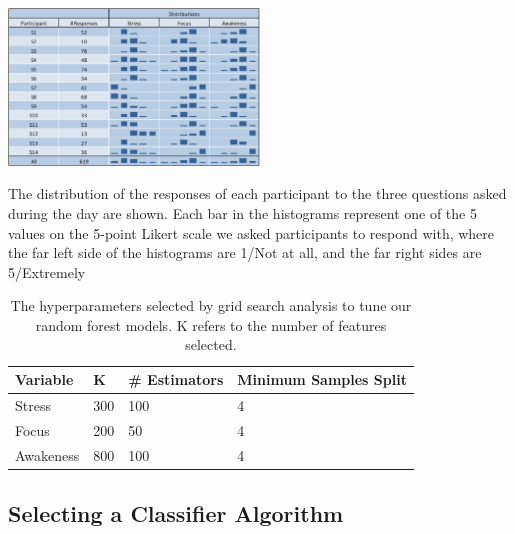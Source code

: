 \begin{table}
  \centering
      \includegraphics[width=0.5\textwidth]{distributiontable.pdf}
  \caption{The distribution of the responses of each participant to the three questions asked during the day are shown. Each bar in the histograms represent one of the 5 values on the 5-point Likert scale we asked participants to respond with, where the far left side of the histograms are 1/Not at all, and the far right sides are 5/Extremely}
   \label{responseDistribution}
   \vspace*{-2mm}
\end{table}

\begin{table}[h]
	\begin{centering}
	\small\addtolength{\tabcolsep}{-1pt}
    \begin{tabular}{llll}
      \hline
      Variable & K & \# Estimators & Minimum Samples Split \\
      \hline
      Stress & 300 & 100 & 4\\
      Focus & 200 & 50 & 4\\
      Awakeness & 800 & 100 & 4\\
      \hline
    \end{tabular}
    \caption{The hyperparameters selected by grid search analysis to tune our random forest models. K refers to the number of features selected.}    \label{tab:hyperparams}
    \end{centering}
\end{table}

\subsection{Selecting a Classifier Algorithm}

